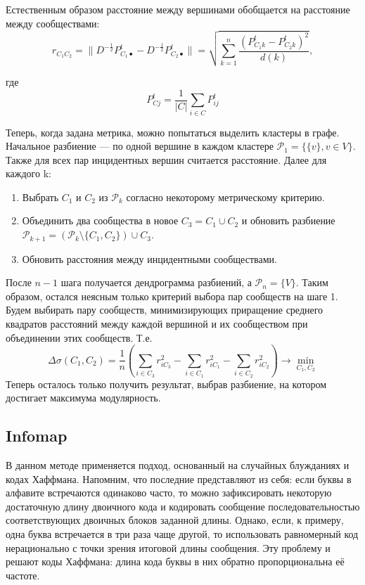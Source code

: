 \documentclass[12pt]{article}
\begin{document}
Естественным образом расстояние между вершинами обобщается на расстояние между сообществами:
\[
r_{C_1 C_2} = \bigl\|D^{-\frac{1}{2}}P^t_{C_1\bullet} - D^{-\frac{1}{2}}P^t_{C_2\bullet}\bigr\| = \sqrt{\sum\limits_{k=1}^{n}\frac{(P_{C_1k}^t - P_{C_2k}^t)^2}{d(k)}},
\]

где 
\[
P_{Cj}^t = \frac{1}{|C|}\sum\limits_{i\in C}P_{ij}^t
\]

Теперь, когда задана метрика, можно попытаться выделить кластеры в графе.
Начальное разбиение --- по одной вершине в каждом кластере $\mathcal{P}_1 = \{\{v\}, v\in V\}$. Также для всех пар инцидентных вершин считается расстояние. Далее для каждого k:
\begin{enumerate}
\item Выбрать $C_1$ и $C_2$ из $\mathcal{P}_k$ согласно некоторому метрическому критерию. 
\item Объединить два сообщества в новое $C_3 = C_1 \cup C_2$ и обновить разбиение $\mathcal{P}_{k+1} = (\mathcal{P}_k \setminus \{C_1, C_2\}) \cup C_3$.
\item Обновить расстояния между инцидентными сообществами.
\end{enumerate}

После $n-1$ шага получается дендрограмма разбиений, а $\mathcal{P}_n = \{V\}$. Таким образом, остался неясным только критерий выбора пар сообществ на шаге 1.
Будем выбирать пару сообществ, минимизирующих приращение среднего квадратов расстояний между каждой вершиной и их сообществом при объединении этих сообществ. Т.е.
\[
\Delta\sigma(C_1, C_2) = \frac{1}{n}\left(\sum\limits_{i\in C_3}r_{iC_3}^2 - \sum\limits_{i\in C_1}r_{iC_1}^2 - \sum\limits_{i\in C_2}r_{iC_2}^2 \right) \to \min\limits_{C_1, C_2}
\]
Теперь осталось только получить результат, выбрав разбиение, на котором достигает максимума модулярность.


\subsection{Infomap}

В данном методе применяется подход, основанный на случайных блужданиях и кодах Хаффмана. Напомним, что последние представляют из себя: если буквы в алфавите встречаются одинаково часто, то можно зафиксировать некоторую достаточную длину двоичного кода и кодировать сообщение последовательностью соответствующих двоичных блоков заданной длины. Однако, если, к примеру, одна буква встречается в три раза чаще другой, то использовать равномерный код нерационально с точки зрения итоговой длины сообщения. Эту проблему и решают коды Хаффмана: длина кода буквы в них обратно пропорциональна её частоте.
\end{document}
